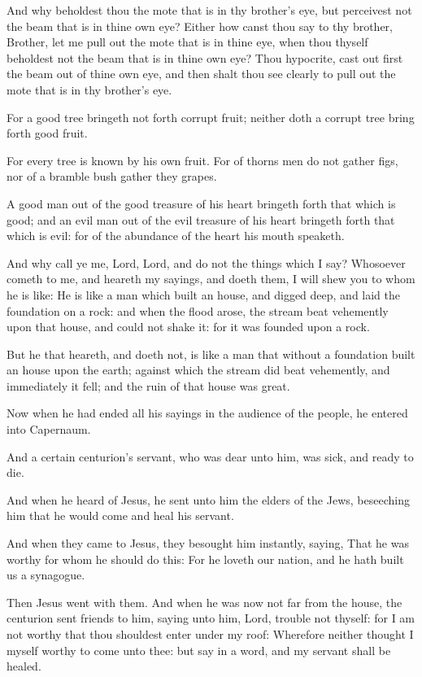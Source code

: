 \Verse And why beholdest thou the mote that is in thy brother's eye, but perceivest not the beam that is in thine own eye?  \Verse Either how canst thou say to thy brother, Brother, let me pull out the mote that is in thine eye, when thou thyself beholdest not the beam that is in thine own eye? Thou hypocrite, cast out first the beam out of thine own eye, and then shalt thou see clearly to pull out the mote that is in thy brother's eye.

\Verse For a good tree bringeth not forth corrupt fruit; neither doth a corrupt tree bring forth good fruit.

\Verse For every tree is known by his own fruit. For of thorns men do not gather figs, nor of a bramble bush gather they grapes.

\Verse A good man out of the good treasure of his heart bringeth forth that which is good; and an evil man out of the evil treasure of his heart bringeth forth that which is evil: for of the abundance of the heart his mouth speaketh.

\Verse And why call ye me, Lord, Lord, and do not the things which I say?  \Verse Whosoever cometh to me, and heareth my sayings, and doeth them, I will shew you to whom he is like: \Verse He is like a man which built an house, and digged deep, and laid the foundation on a rock: and when the flood arose, the stream beat vehemently upon that house, and could not shake it: for it was founded upon a rock.

\Verse But he that heareth, and doeth not, is like a man that without a foundation built an house upon the earth; against which the stream did beat vehemently, and immediately it fell; and the ruin of that house was great.


\Chapter
\Verse Now when he had ended all his sayings in the audience of the people, he entered into Capernaum.

\Verse And a certain centurion's servant, who was dear unto him, was sick, and ready to die.

\Verse And when he heard of Jesus, he sent unto him the elders of the Jews, beseeching him that he would come and heal his servant.

\Verse And when they came to Jesus, they besought him instantly, saying, That he was worthy for whom he should do this: \Verse For he loveth our nation, and he hath built us a synagogue.

\Verse Then Jesus went with them. And when he was now not far from the house, the centurion sent friends to him, saying unto him, Lord, trouble not thyself: for I am not worthy that thou shouldest enter under my roof: \Verse Wherefore neither thought I myself worthy to come unto thee: but say in a word, and my servant shall be healed.

